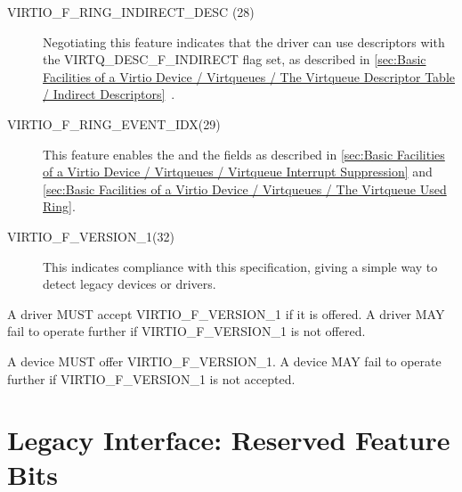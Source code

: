 \begin{description}
  \item[VIRTIO_F_RING_INDIRECT_DESC (28)] Negotiating this feature indicates
  that the driver can use descriptors with the VIRTQ_DESC_F_INDIRECT
  flag set, as described in \ref{sec:Basic Facilities of a Virtio Device / Virtqueues / The Virtqueue Descriptor Table / Indirect Descriptors}~.

  \item[VIRTIO_F_RING_EVENT_IDX(29)] This feature enables the 
  and the  fields as described in \ref{sec:Basic Facilities of a Virtio Device / Virtqueues / Virtqueue Interrupt Suppression} and \ref{sec:Basic Facilities of a Virtio Device / Virtqueues / The Virtqueue Used Ring}.

  \item[VIRTIO_F_VERSION_1(32)] This indicates compliance with this
    specification, giving a simple way to detect legacy devices or drivers.
\end{description}


A driver MUST accept VIRTIO_F_VERSION_1 if it is offered.  A driver
MAY fail to operate further if VIRTIO_F_VERSION_1 is not offered.


A device MUST offer VIRTIO_F_VERSION_1.  A device MAY fail to operate further
if VIRTIO_F_VERSION_1 is not accepted.

\section{Legacy Interface: Reserved Feature Bits}\label{sec:Reserved Feature Bits / Legacy Interface: Reserved Feature Bits}

